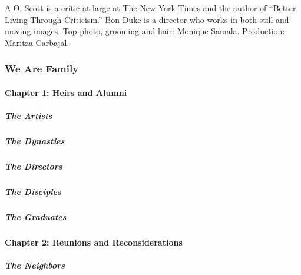 A.O. Scott is a critic at large at The New York Times and the author of
``Better Living Through Criticism.'' Bon Duke is a director who works in
both still and moving images. Top photo, grooming and hair: Monique
Samala. Production: Maritza Carbajal.

\hypertarget{we-are-family-1}{%
\subsubsection{We Are Family}\label{we-are-family-1}}

\hypertarget{chapter-1-heirs-and-alumni-1}{%
\paragraph{Chapter 1: Heirs and
Alumni}\label{chapter-1-heirs-and-alumni-1}}

\href{/interactive/2020/04/13/t-magazine/black-art-galleries.html}{}

\hypertarget{the-artists}{%
\subparagraph{The Artists}\label{the-artists}}

\href{/interactive/2020/04/13/t-magazine/italian-fashion-design-houses.html}{}

\hypertarget{the-dynasties}{%
\subparagraph{The Dynasties}\label{the-dynasties}}

\href{/interactive/2020/04/13/t-magazine/gordon-parks.html}{}

\hypertarget{the-directors-1}{%
\subparagraph{The Directors}\label{the-directors-1}}

\href{/interactive/2020/04/13/t-magazine/enrique-olvera-chef.html}{}

\hypertarget{the-disciples}{%
\subparagraph{The Disciples}\label{the-disciples}}

\href{/interactive/2020/04/13/t-magazine/royal-academy-antwerp.html}{}

\hypertarget{the-graduates}{%
\subparagraph{The Graduates}\label{the-graduates}}

\hypertarget{chapter-2-reunions-and-reconsiderations}{%
\paragraph{Chapter 2: Reunions and
Reconsiderations}\label{chapter-2-reunions-and-reconsiderations}}

\href{/interactive/2020/04/13/t-magazine/ninth-street-greenwich-village-neighbors.html}{}

\hypertarget{the-neighbors}{%
\subparagraph{The Neighbors}\label{the-neighbors}}

